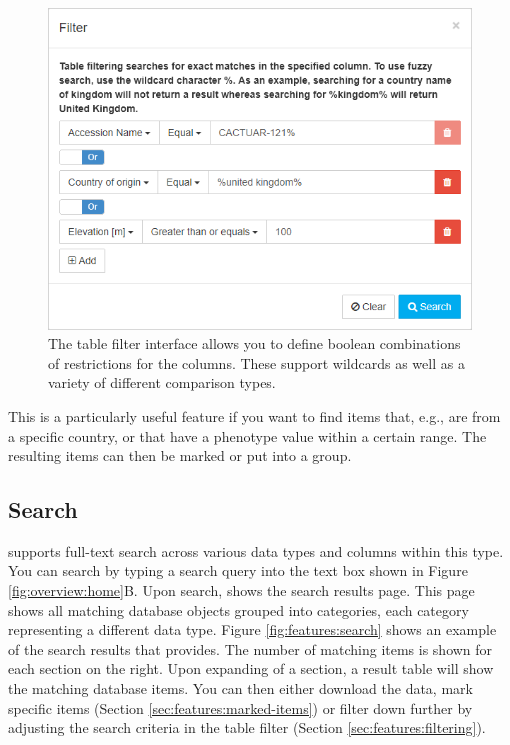 \begin{figure}
	\centering
	\includegraphics[width=0.5\linewidth]{img/features/table-filtering.png}
	\caption{The table filter interface allows you to define boolean combinations of restrictions for the columns. These support wildcards as well as a variety of different comparison types.}
	\label{fig:features:filtering}
\end{figure}

This is a particularly useful feature if you want to find items that, e.g., are from a specific country, or that have a phenotype value within a certain range. The resulting items can then be marked or put into a group.

\subsection{Search}
\label{sec:features:search}
{\germinate} supports full-text search across various data types and columns within this type. You can search by typing a search query into the text box shown in Figure \ref{fig:overview:home}B. Upon search, {\germinate} shows the search results page. This page shows all matching database objects grouped into categories, each category representing a different data type. Figure \ref{fig:features:search} shows an example of the search results that {\germinate} provides. The number of matching items is shown for each section on the right. Upon expanding of a section, a result table will show the matching database items. You can then either download the data, mark specific items (\cf Section \ref{sec:features:marked-items}) or filter down further by adjusting the search criteria in the table filter (\cf Section \ref{sec:features:filtering}).

